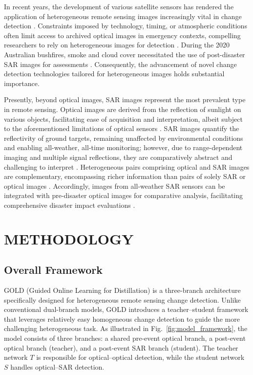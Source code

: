 \documentclass[a4paper,fleqn]{cas-dc}
\begin{document}
In recent years, the development of various satellite sensors has rendered the application of heterogeneous remote sensing images increasingly vital in change detection \cite{B12}. Constraints imposed by technology, timing, or atmospheric conditions often limit access to archived optical images in emergency contexts, compelling researchers to rely on heterogeneous images for detection \cite{B19}. During the 2020 Australian bushfires, smoke and cloud cover necessitated the use of post-disaster SAR images for assessments \cite{B20}. Consequently, the advancement of novel change detection technologies tailored for heterogeneous images holds substantial importance.

Presently, beyond optical images, SAR images represent the most prevalent type in remote sensing. Optical images are derived from the reflection of sunlight on various objects, facilitating ease of acquisition and interpretation, albeit subject to the aforementioned limitations of optical sensors \cite{B16}. SAR images quantify the reflectivity of ground targets, remaining unaffected by environmental conditions and enabling all-weather, all-time monitoring; however, due to range-dependent imaging and multiple signal reflections, they are comparatively abstract and challenging to interpret \cite{B21}. Heterogeneous pairs comprising optical and SAR images are complementary, encompassing richer information than pairs of solely SAR or optical images \cite{B11}. Accordingly, images from all-weather SAR sensors can be integrated with pre-disaster optical images for comparative analysis, facilitating comprehensive disaster impact evaluations \cite{B22}.


\section{METHODOLOGY}
\subsection{Overall Framework}
GOLD (Guided Online Learning for Distillation) is a three-branch architecture specifically designed for heterogeneous remote sensing change detection. Unlike conventional dual-branch models, GOLD introduces a teacher–student framework that leverages relatively easy homogeneous change detection to guide the more challenging heterogeneous task. As illustrated in Fig.~\ref{fig:model_framework}, the model consists of three branches: a shared pre-event optical branch, a post-event optical branch (teacher), and a post-event SAR branch (student). The teacher network $T$ is responsible for optical–optical detection, while the student network $S$ handles optical–SAR detection.
\end{document}
